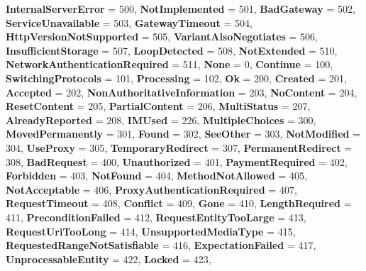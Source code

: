\begin{DoxyCompactItemize}
{\bfseries Internal\+Server\+Error} = 500, 
\newline
{\bfseries Not\+Implemented} = 501, 
{\bfseries Bad\+Gateway} = 502, 
{\bfseries Service\+Unavailable} = 503, 
{\bfseries Gateway\+Timeout} = 504, 
\newline
{\bfseries Http\+Version\+Not\+Supported} = 505, 
{\bfseries Variant\+Also\+Negotiates} = 506, 
{\bfseries Insufficient\+Storage} = 507, 
{\bfseries Loop\+Detected} = 508, 
\newline
{\bfseries Not\+Extended} = 510, 
{\bfseries Network\+Authentication\+Required} = 511, 
{\bfseries None} = 0, 
{\bfseries Continue} = 100, 
\newline
{\bfseries Switching\+Protocols} = 101, 
{\bfseries Processing} = 102, 
{\bfseries Ok} = 200, 
{\bfseries Created} = 201, 
\newline
{\bfseries Accepted} = 202, 
{\bfseries Non\+Authoritative\+Information} = 203, 
{\bfseries No\+Content} = 204, 
{\bfseries Reset\+Content} = 205, 
\newline
{\bfseries Partial\+Content} = 206, 
{\bfseries Multi\+Status} = 207, 
{\bfseries Already\+Reported} = 208, 
{\bfseries I\+M\+Used} = 226, 
\newline
{\bfseries Multiple\+Choices} = 300, 
{\bfseries Moved\+Permanently} = 301, 
{\bfseries Found} = 302, 
{\bfseries See\+Other} = 303, 
\newline
{\bfseries Not\+Modified} = 304, 
{\bfseries Use\+Proxy} = 305, 
{\bfseries Temporary\+Redirect} = 307, 
{\bfseries Permanent\+Redirect} = 308, 
\newline
{\bfseries Bad\+Request} = 400, 
{\bfseries Unauthorized} = 401, 
{\bfseries Payment\+Required} = 402, 
{\bfseries Forbidden} = 403, 
\newline
{\bfseries Not\+Found} = 404, 
{\bfseries Method\+Not\+Allowed} = 405, 
{\bfseries Not\+Acceptable} = 406, 
{\bfseries Proxy\+Authentication\+Required} = 407, 
\newline
{\bfseries Request\+Timeout} = 408, 
{\bfseries Conflict} = 409, 
{\bfseries Gone} = 410, 
{\bfseries Length\+Required} = 411, 
\newline
{\bfseries Precondition\+Failed} = 412, 
{\bfseries Request\+Entity\+Too\+Large} = 413, 
{\bfseries Request\+Uri\+Too\+Long} = 414, 
{\bfseries Unsupported\+Media\+Type} = 415, 
\newline
{\bfseries Requested\+Range\+Not\+Satisfiable} = 416, 
{\bfseries Expectation\+Failed} = 417, 
{\bfseries Unprocessable\+Entity} = 422, 
{\bfseries Locked} = 423, 
\newline

\end{DoxyCompactItemize}
